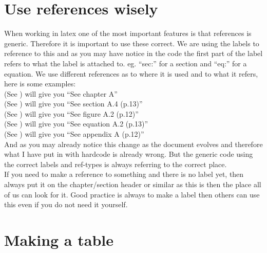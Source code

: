 \section{Use references wisely} \label{sec:refs}
When working in latex one of the most important features is that references is generic. Therefore it is important to use these correct. We are using the labels to reference to this and as you may have notice in the code the first part of the label refers to what the label is attached to. eg. ``sec:'' for a section and ``eq:'' for a equation. We use different references as to where it is used and to what it refers, here is some examples:\\

(See ) will give you ``See chapter A'' \\ %
(See ) will give you ``See section A.4 (p.13)'' \\
(See ) will give you ``See figure A.2 (p.12)'' \\
(See ) will give you ``See equation A.2 (p.13)'' \\
(See ) will give you ``See appendix A (p.12)'' \\

And as you may already notice this change as the document evolves and therefore what I have put in with hardcode is already wrong. But the generic code using the correct labels and ref-types is always referring to the correct place.\\

If you need to make a reference to something and there is no label yet, then always put it on the chapter/section header or similar as this is then the place all of us can look for it. Good practice is always to make a label then others can use this even if you do not need it yourself.

\section{Making a table} 

